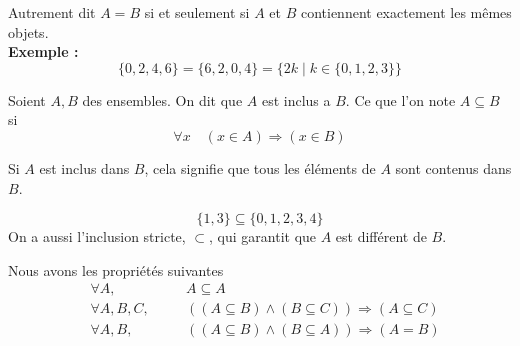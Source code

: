 Autrement dit $A=B$ si et seulement si $A$ et $B$ contiennent exactement les mêmes objets.\\
\textbf{Exemple :}
\[
\{0,2,4,6\}=\{6,2,0,4\}=\{2k\;|\;k\in \{0,1,2,3\}\}
\]

    \begin{definition}[Inclusion]
    Soient $A,B$ des ensembles. On dit que $A$ est inclus a $B$. Ce que l'on note $A\subseteq B$ si 
    \[
    \forall x \quad (x\in A)\Rightarrow(x\in B)
    \]
    \end{definition}

Si $A$ est inclus dans $B$, cela signifie que tous les éléments de $A$ sont contenus dans $B$.
\begin{exemple}
    \[
\{1,3\}\subseteq \{0,1,2,3,4\}
\]
On a aussi l'inclusion stricte, $\subset$, qui garantit que $A$ est différent de $B$.
\end{exemple}


\begin{center}
\end{center}

\begin{remarque}
    Nous avons les propriétés suivantes
    \begin{align*}
        &\forall A, \quad &&A \subseteq A\\
        &\forall A,B,C, \quad &&((A\subseteq B) \wedge(B\subseteq C)) \Rightarrow (A\subseteq C)\\
        &\forall A,B, \quad &&((A\subseteq B)\wedge(B\subseteq A)) \Rightarrow (A=B)
    \end{align*}
\end{remarque}



